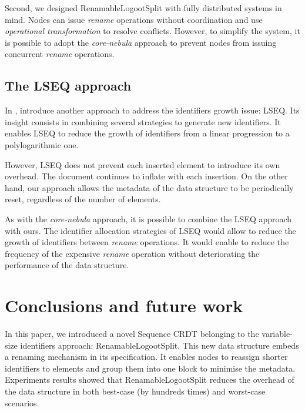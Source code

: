 \documentclass[sigplan,10pt]{acmart}
\begin{document}
Second, we designed RenamableLogootSplit with fully distributed systems in mind.
Nodes can issue \emph{rename} operations without coordination and use \emph{operational transformation} to resolve conflicts.
However, to simplify the system, it is possible to adopt the \emph{core-nebula} approach to prevent nodes from issuing concurrent \emph{rename} operations.

\subsection{The LSEQ approach}

In \cite{nedelec_2013_lseq,doi:10.1002/cpe.4108}, \citeauthor{nedelec_2013_lseq} introduce another approach to address the identifiers growth issue: LSEQ.
Its insight consists in combining several strategies to generate new identifiers.
It enables LSEQ to reduce the growth of identifiers from a linear progression to a polylogarithmic one.

However, LSEQ does not prevent each inserted element to introduce its own overhead.
The document continues to inflate with each insertion.
On the other hand, our approach allows the metadata of the data structure to be periodically reset, regardless of the number of elements.

As with the \emph{core-nebula} approach, it is possible to combine the LSEQ approach with ours.
The identifier allocation strategies of LSEQ would allow to reduce the growth of identifiers between \emph{rename} operations.
It would enable to reduce the frequency of the expensive \emph{rename} operation without deteriorating the performance of the data structure.

\section{Conclusions and future work}
\label{sec:conclusion}

\begin{sloppypar}
In this paper, we introduced a novel Sequence \ac{CRDT} belonging to the variable-size identifiers approach: RenamableLogootSplit.
This new data structure embeds a renaming mechanism in its specification.
It enables nodes to reassign shorter identifiers to elements and group them into one block to minimise the metadata.
Experiments results showed that RenamableLogootSplit reduces the overhead of the data structure in both best-case (by hundreds times) and worst-case scenarios.
\end{sloppypar}
\end{document}
